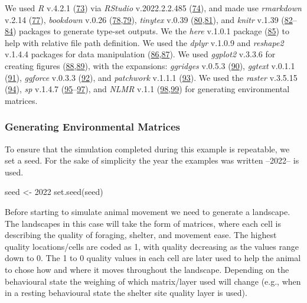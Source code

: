 \documentclass[10pt,a4paper]{article}
\newenvironment{Shaded}{}{}
\newcommand{\DecValTok}[1]{#1}
\newcommand{\FunctionTok}[1]{#1}
\newcommand{\NormalTok}[1]{#1}
\newcommand{\OtherTok}[1]{#1}
\begin{document}
We used \emph{R} v.4.2.1 (\protect\hyperlink{ref-R-base}{73}) via \emph{RStudio} v.2022.2.2.485 (\protect\hyperlink{ref-RStudioTeam2021}{74}), and made use \emph{rmarkdown} v.2.14 (\protect\hyperlink{ref-rmarkdown2020}{77}), \emph{bookdown} v.0.26 (\protect\hyperlink{ref-bookdown2016}{78},\protect\hyperlink{ref-R-bookdown}{79}), \emph{tinytex} v.0.39 (\protect\hyperlink{ref-tinytex2019}{80},\protect\hyperlink{ref-R-tinytex}{81}), and \emph{knitr} v.1.39 (\protect\hyperlink{ref-knitr2015}{82}--\protect\hyperlink{ref-R-knitr}{84}) packages to generate type-set outputs.
We the \emph{here} v.1.0.1 package (\protect\hyperlink{ref-R-here}{85}) to help with relative file path definition.
We used the \emph{dplyr} v.1.0.9 and \emph{reshape2} v.1.4.4 packages for data manipulation (\protect\hyperlink{ref-R-dplyr}{86},\protect\hyperlink{ref-reshape22007}{87}).
We used \emph{ggplot2} v.3.3.6 for creating figures (\protect\hyperlink{ref-R-ggplot2}{88},\protect\hyperlink{ref-ggplot22016}{89}), with the expansions: \emph{ggridges} v.0.5.3 (\protect\hyperlink{ref-R-ggridges}{90}), \emph{ggtext} v.0.1.1 (\protect\hyperlink{ref-R-ggtext}{91}), \emph{ggforce} v.0.3.3 (\protect\hyperlink{ref-R-ggforce}{92}), and \emph{patchwork} v.1.1.1 (\protect\hyperlink{ref-R-patchwork}{93}).
We used the \emph{raster} v.3.5.15 (\protect\hyperlink{ref-R-raster}{94}), \emph{sp} v.1.4.7 (\protect\hyperlink{ref-sp2013}{95}--\protect\hyperlink{ref-R-sp}{97}), and \emph{NLMR} v.1.1 (\protect\hyperlink{ref-NLMR2018}{98},\protect\hyperlink{ref-R-NLMR}{99}) for generating environmental matrices.

\hypertarget{generating-environmental-matrices}{%
\subsubsection{Generating Environmental Matrices}\label{generating-environmental-matrices}}

To ensure that the simulation completed during this example is repeatable, we set a seed.
For the sake of simplicity the year the examples was written --2022-- is used.

\begin{Shaded}
\begin{Highlighting}[]
\NormalTok{seed }\OtherTok{\textless{}{-}} \DecValTok{2022}
\FunctionTok{set.seed}\NormalTok{(seed)}
\end{Highlighting}
\end{Shaded}

Before starting to simulate animal movement we need to generate a landscape.
The landscapes in this case will take the form of matrices, where each cell is describing the quality of foraging, shelter, and movement ease.
The highest quality locations/cells are coded as 1, with quality decreasing as the values range down to 0.
The 1 to 0 quality values in each cell are later used to help the animal to chose how and where it moves throughout the landscape.
Depending on the behavioural state the weighing of which matrix/layer used will change (e.g., when in a resting behavioural state the shelter site quality layer is used).
\end{document}
